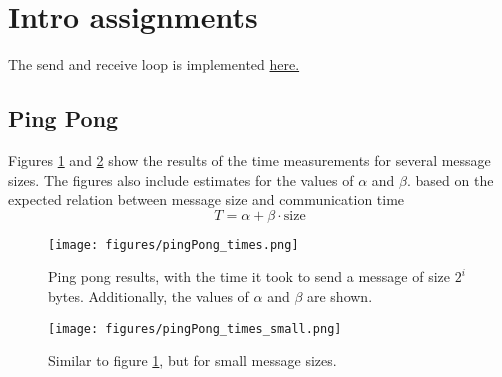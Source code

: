 \setcounter{section}{-1}
\section{Intro assignments}

The send and receive loop is implemented 
\href{https://github.com/PhilipSoliman/hpc-labs/blob/b16da8d7ee717657e13c316369fa0996da7816cc/intro/pingPong.c#L59-L121}{here.}

\subsection{Ping Pong}
Figures \ref{fig:pingpong} and \ref{fig:pingpong_small} show the results of the 
time measurements for several message sizes. The figures also include estimates for the values of $\alpha$ and $\beta$.
based on the expected relation between message size and communication time
\begin{equation}
    T = \alpha + \beta \cdot \text{size}
    \label{eq:pingpong}
\end{equation}

\begin{figure}[H]
    \centering
    \texttt{[image: figures/pingPong\_times.png]}
    \caption{Ping pong results, with the time it took to send a
             message of size $2^i$ bytes. Additionally, the values of $\alpha$ and $\beta$ are shown.}
    \label{fig:pingpong}
\end{figure}

\begin{figure}[H]
    \centering
    \texttt{[image: figures/pingPong\_times\_small.png]}
    \caption{Similar to figure \ref{fig:pingpong}, but for small message sizes.}
    \label{fig:pingpong_small}
\end{figure}

